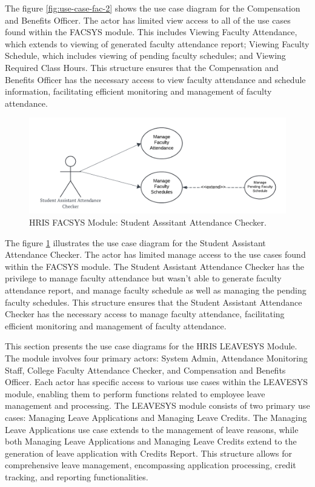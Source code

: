     The figure \ref{fig:use-case-fac-2} shows the use case diagram for the Compensation and Benefits Officer. The actor has limited view access to all of the use cases found within the FACSYS module. This includes Viewing Faculty Attendance, which extends to viewing of generated faculty attendance report; Viewing Faculty Schedule, which includes viewing of pending faculty schedules; and Viewing Required Class Hours. This structure ensures that the Compensation and Benefits Officer has the necessary access to view faculty attendance and schedule information, facilitating efficient monitoring and management of faculty attendance.

    \begin{figure}[H]
        \centering
        \includegraphics[width=0.9\linewidth]{figures/images/use-case-fac-3.png}
        \caption{HRIS FACSYS Module: Student Asssitant Attendance Checker.}
        \label{fig:use-case-fac-3}
    \end{figure}

    The figure \ref{fig:use-case-fac-3} illustrates the use case diagram for the Student Assistant Attendance Checker. The actor has limited manage access to the use cases found within the FACSYS module. The Student Assistant Attendance Checker has the privilege to manage faculty attendance but wasn't able to generate faculty attendance report, and manage faculty schedule as well as managing the pending faculty schedules. This structure ensures that the Student Assistant Attendance Checker has the necessary access to manage faculty attendance, facilitating efficient monitoring and management of faculty attendance. 
    

    This section presents the use case diagrams for the HRIS LEAVESYS Module. The module involves four primary actors: System Admin, Attendance Monitoring Staff, College Faculty Attendance Checker, and Compensation and Benefits Officer. Each actor has specific access to various use cases within the LEAVESYS module, enabling them to perform functions related to employee leave management and processing. The LEAVESYS module consists of two primary use cases: Managing Leave Applications and Managing Leave Credits. The Managing Leave Applications use case extends to the management of leave reasons, while both Managing Leave Applications and Managing Leave Credits extend to the generation of leave application with Credits Report. This structure allows for comprehensive leave management, encompassing application processing, credit tracking, and reporting functionalities.

